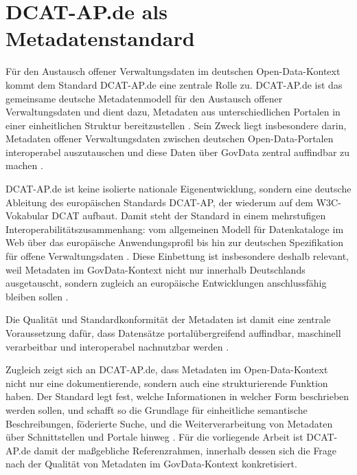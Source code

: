\section{DCAT-AP.de als Metadatenstandard} %

Für den Austausch offener Verwaltungsdaten im deutschen Open-Data-Kontext kommt dem Standard DCAT-AP.de eine zentrale Rolle zu. DCAT-AP.de ist das gemeinsame deutsche Metadatenmodell für den Austausch offener Verwaltungsdaten und dient dazu, Metadaten aus unterschiedlichen Portalen in einer einheitlichen Struktur bereitzustellen \cite{DCATAPDEStart}. Sein Zweck liegt insbesondere darin, Metadaten offener Verwaltungsdaten zwischen deutschen Open-Data-Portalen interoperabel auszutauschen und diese Daten über GovData zentral auffindbar zu machen \cite{DCATAPDESpec3,DCATAPDESpec2}. 

DCAT-AP.de ist keine isolierte nationale Eigenentwicklung, sondern eine deutsche Ableitung des europäischen Standards DCAT-AP, der wiederum auf dem W3C-Vokabular DCAT aufbaut. Damit steht der Standard in einem mehrstufigen Interoperabilitätszusammenhang: vom allgemeinen Modell für Datenkataloge im Web über das europäische Anwendungsprofil bis hin zur deutschen Spezifikation für offene Verwaltungsdaten \cite{DCATAPDEStart,DCATAPDESpec3}. Diese Einbettung ist insbesondere deshalb relevant, weil Metadaten im GovData-Kontext nicht nur innerhalb Deutschlands ausgetauscht, sondern zugleich an europäische Entwicklungen anschlussfähig bleiben sollen \cite{FitkoGovdata}. 

Die Qualität und Standardkonformität der Metadaten ist damit eine zentrale Voraussetzung dafür, dass Datensätze portalübergreifend auffindbar, maschinell verarbeitbar und interoperabel nachnutzbar werden \cite{FitkoGovdata, FITKOGovDataDocs}.

Zugleich zeigt sich an DCAT-AP.de, dass Metadaten im Open-Data-Kontext nicht nur eine dokumentierende, sondern auch eine strukturierende Funktion haben. Der Standard legt fest, welche Informationen in welcher Form beschrieben werden sollen, und schafft so die Grundlage für einheitliche semantische Beschreibungen, föderierte Suche, und die Weiterverarbeitung von Metadaten über Schnittstellen und Portale hinweg \cite{DCATAPDESpec3,DCATAPDEImplRules2}. Für die vorliegende Arbeit ist DCAT-AP.de damit der maßgebliche Referenzrahmen, innerhalb dessen sich die Frage nach der Qualität von Metadaten im GovData-Kontext konkretisiert.

